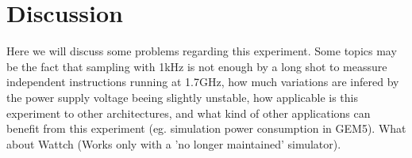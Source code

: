 \section{Discussion}
Here we will discuss some problems regarding this experiment. Some topics may be the fact that sampling with 1kHz is not enough by a long shot to meassure independent instructions
running at 1.7GHz, how much variations are infered by the power supply voltage beeing slightly unstable, how applicable is this experiment to other architectures, and what kind
of other applications can benefit from this experiment (eg. simulation power consumption in GEM5). What about Wattch (Works only with a 'no longer maintained' simulator).
